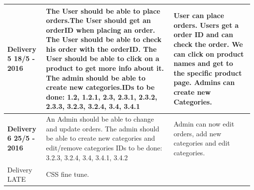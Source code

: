 \documentclass[a4paper,12pt]{article}
\begin{document}
\begin{table}[htbp]
\begin{tabular}{|L{4cm}|L{7cm}|L{4cm}|}
		\textbf{Delivery 5 18/5 - 2016} & The User should be able to place orders.\newline The User should get an orderID when placing an order. \newline The User should be able to check his order with the orderID. \newline The User should be able to click on a product to get more info about it. \newline The admin should be able to create new categories.\newline IDs to be done: 1.2, 1.2.1, 2.3, 2.3.1, 2.3.2, 2.3.3, 3.2.3, 3.2.4, 3.4, 3.4.1 & User can place orders. \newline Users get a order ID and can check the order. \newline We can click on product names and get to the specific product page. \newline Admins can create new Categories.            \\ \hline
		\textbf{Delivery 6 25/5 - 2016} &  An Admin should be able to change and update orders. \newline The admin should be able to create new categories and edit/remove categories \newline IDs to be done: 3.2.3, 3.2.4, 3.4, 3.4.1, 3.4.2 & Admin can now edit orders, add new categories and edit categories.                   \\ \hline
		Delivery LATE &  CSS fine tune. \newline 		&		\\ \hline
	\end{tabular}
\end{table}
\end{document}
